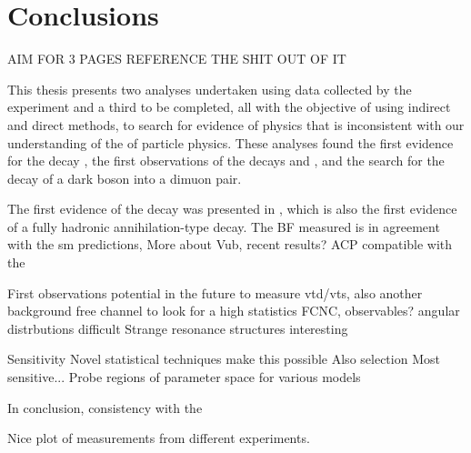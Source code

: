 \chapter{Conclusions}
\label{ch:conc}

AIM FOR 3 PAGES
REFERENCE THE SHIT OUT OF IT

This thesis presents two analyses undertaken using data collected by the \lhcb experiment
and a third to be completed, all
with the objective of using indirect and direct methods, to search for evidence of physics that is
inconsistent with our understanding of the \sm of particle physics.
These analyses found the first evidence for the decay \btodsphi, the first observations of the
decays \btokpipimumu and \btophikmumu, and the search for the decay of a dark boson into a dimuon
pair.

The first evidence of the decay \btodsphi was presented in , which is also the
first evidence of a fully hadronic annihilation-type decay.
The BF measured is in agreement with the sm predictions,
More about Vub, recent results?
ACP compatible with the \sm


\btokpipimumu \btophikmumu
First observations
potential in the future to measure vtd/vts, also another background free channel to look for a \db
high statistics
FCNC, observables?
angular distrbutions difficult
Strange resonance structures interesting


\btokstrdb
Sensitivity
Novel statistical techniques make this possible
Also selection
Most sensitive...
Probe regions of parameter space for various models



In conclusion,
consistency with the \sm

Nice plot of measurements from different experiments.








